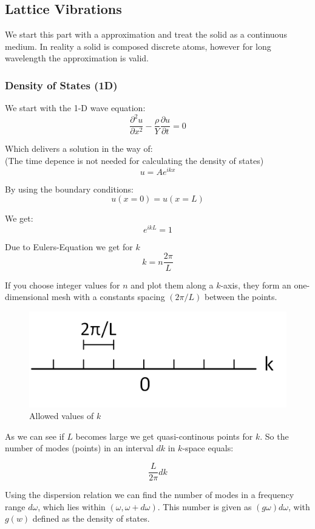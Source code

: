 \subsection{Lattice Vibrations} \label{chap3}
We start this part with a approximation and treat the solid as a continuous medium.
In reality a solid is composed discrete atoms, however for long wavelength the 
approximation is valid.

\subsubsection*{Density of States (1D)}

We start with the 1-D wave equation:
$$\frac{\partial^2 u}{\partial x^2} - \frac{\rho}{Y} \frac{\partial u}{\partial t} = 0$$

Which delivers a solution in the way of:\\
(The time depence is not needed for calculating the density of states)
\begin{equation}
    u = Ae^{ikx}
    \label{eq:sol_1d_wave}
\end{equation}

By using the boundary conditions:
$$u(x=0) = u(x=L)$$

We get:
$$e^{ikL} = 1$$

Due to Eulers-Equation we get for $k$
$$k = n \frac{2\pi}{L}$$

If you choose integer values for $n$ and plot them along a $k$-axis, they form
an one-dimensional mesh with a constants spacing $(2\pi/L)$ between the points.

\begin{figure}[H]
	\centering
	\includegraphics[width=0.4\linewidth]{Graphics/Chapter3/allowed_values_k_1D}
	\caption{Allowed values of $k$}
	\label{}
\end{figure}

As we can see if $L$ becomes large we get quasi-continous points for $k$. So the 
number of modes (points) in an interval $dk$ in $k$-space equals:

$$\dfrac{L}{2\pi} dk$$

Using the dispersion relation we can find the number of modes in a frequency
range $d\omega$, which lies within $(\omega, \omega + d\omega)$.
This number is given as $(g\omega)d\omega$, with
$g(w)$ defined as the density of states.

